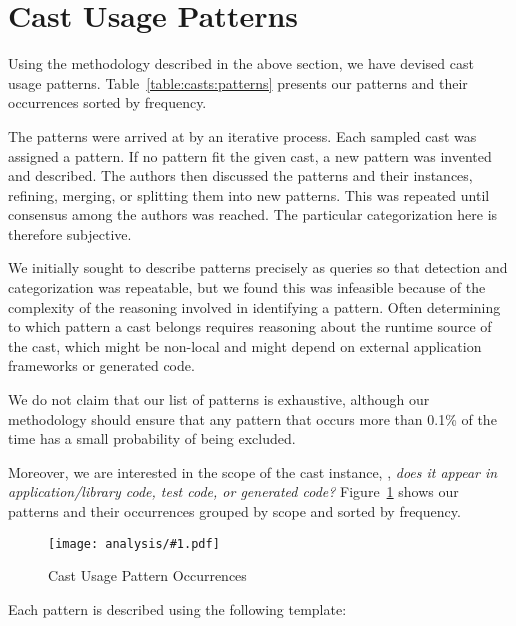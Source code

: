 \section{Cast Usage Patterns}
\label{sec:casts:patterns}

Using the methodology described in the above section,
we have devised \nPattern{} cast usage patterns.
Table~\ref{table:casts:patterns} presents our patterns and their
occurrences sorted by frequency.




The patterns were arrived at by an iterative process.
Each sampled cast was assigned a pattern.
If no pattern fit the given cast,
a new pattern was invented and described.
The authors then discussed the patterns and their instances,
refining, merging, or splitting them into new patterns.
This was repeated until consensus among the authors was reached.
The particular categorization here is therefore subjective.

We initially sought to describe patterns precisely as \ql{} queries so that
detection and categorization was repeatable,
but we found this was infeasible because of the
complexity of the reasoning involved in identifying a pattern.
Often determining to which pattern a cast belongs
requires reasoning about the runtime source of the cast,
which might be non-local and might depend on external application
frameworks or generated code.

We do not claim that our list of patterns is exhaustive,
although our methodology should ensure that any pattern that occurs more
than 0.1\% of the time has a small probability of being excluded.

Moreover, we are interested in the scope of the cast instance,
\ie, \emph{does it appear in application/library code, test code, or generated code?}
Figure~\ref{fig:casts:patterns} shows our patterns and their occurrences grouped by scope and sorted by frequency.

\newcommand\plot[3]{
\begin{figure}[ht!]
\centering
\texttt{[image: analysis/\#1.pdf]}
\caption{#3} \label{#2}
\end{figure}
}

\plot{table-patterns}{fig:casts:patterns}{Cast Usage Pattern Occurrences}

Each pattern is described using the following template:

